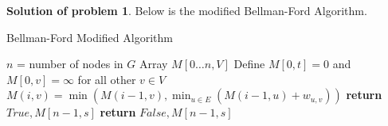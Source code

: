 \documentclass{article}
\theoremstyle{definition}
\newtheorem{problem}{Solution of problem}
\begin{document}
\begin{problem}
  Below is the modified Bellman-Ford Algorithm.

  \begin{algorithm}[H]
    \caption{Bellman-Ford Modified Algorithm}\label{}
    \begin{algorithmic}[1]
      \State $n$ = number of nodes in $G$
      \State Array $M[0\dots n,V]$
      \State Define $M[0,t]=0$ and $M[0,v]= \infty$ for all other $v\in V$
       
          \State $M(i,v) = \min\left(M(i-1,v), \min_{u\in E}(M(i-1,u)+w_{u,v})\right)$
        \EndFor
      \EndFor
       
          \State \textbf{return} $True,M[n-1,s]$
        \EndIf
      \EndFor
      \State \textbf{return} $False,M[n-1,s]$
      \EndProcedure
    \end{algorithmic}
  \end{algorithm}

\end{problem}
\end{document}
